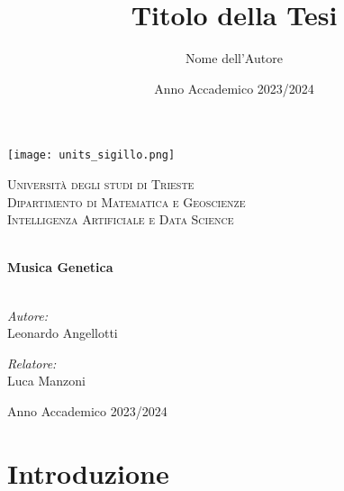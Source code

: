 \documentclass[a4paper,12pt]{report}
\title{Titolo della Tesi}
\author{Nome dell'Autore}
\date{Anno Accademico 2023/2024}
\begin{document}
\begin{titlepage}
    \begin{center}
        \texttt{[image: units\_sigillo.png]} %
        \vspace{1cm}
        
        \textsc{\LARGE Università degli studi di Trieste}\\[1.5cm]
        
        \textsc{\Large Dipartimento di Matematica e Geoscienze}\\[0.5cm]
        
        \textsc{\large Intelligenza Artificiale e Data Science}\\[0.5cm]
        
        \vspace{2cm}
        
        \HRule \\[0.4cm]
        { \huge \bfseries Musica Genetica \\[0.4cm] }
        \HRule \\[1.5cm]
        
        \vspace{2cm}
        
        \begin{minipage}{0.4\textwidth}
            \begin{flushleft} \large
                \emph{Autore:}\\
                Leonardo Angellotti
            \end{flushleft}
        \end{minipage}
        \begin{minipage}{0.4\textwidth}
            \begin{flushright} \large
                \emph{Relatore:} \\
                Luca Manzoni
            \end{flushright}
        \end{minipage}
        
        \vfill
        
        {\large Anno Accademico 2023/2024}
        
    \end{center}
\end{titlepage}

\tableofcontents

\chapter{Introduzione}
\end{document}
